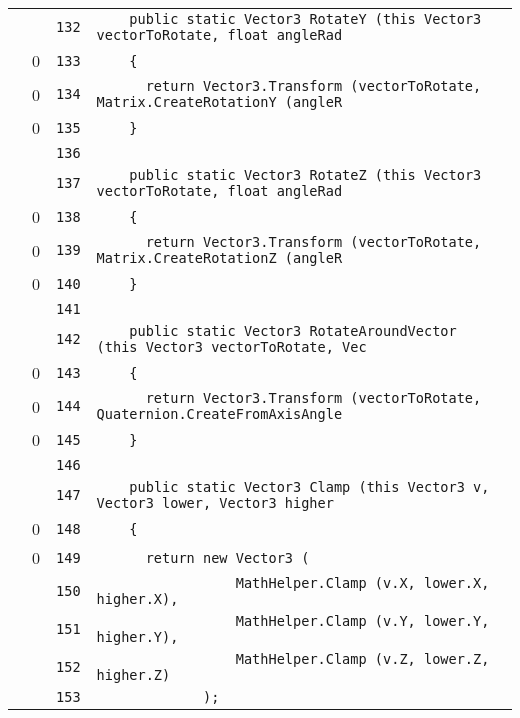 \documentclass[a4paper,10pt]{article}
\begin{document}
\begin{longtable}[l]{lrrl}
\cellcolor{gray} &  & \verb~132~ & \verb~    public static Vector3 RotateY (this Vector3 vectorToRotate, float angleRad~\\
\cellcolor{red} & 0 & \verb~133~ & \verb~    {~\\
\cellcolor{red} & 0 & \verb~134~ & \verb~      return Vector3.Transform (vectorToRotate, Matrix.CreateRotationY (angleR~\\
\cellcolor{red} & 0 & \verb~135~ & \verb~    }~\\
\cellcolor{gray} &  & \verb~136~ & \verb~~\\
\cellcolor{gray} &  & \verb~137~ & \verb~    public static Vector3 RotateZ (this Vector3 vectorToRotate, float angleRad~\\
\cellcolor{red} & 0 & \verb~138~ & \verb~    {~\\
\cellcolor{red} & 0 & \verb~139~ & \verb~      return Vector3.Transform (vectorToRotate, Matrix.CreateRotationZ (angleR~\\
\cellcolor{red} & 0 & \verb~140~ & \verb~    }~\\
\cellcolor{gray} &  & \verb~141~ & \verb~~\\
\cellcolor{gray} &  & \verb~142~ & \verb~    public static Vector3 RotateAroundVector (this Vector3 vectorToRotate, Vec~\\
\cellcolor{red} & 0 & \verb~143~ & \verb~    {~\\
\cellcolor{red} & 0 & \verb~144~ & \verb~      return Vector3.Transform (vectorToRotate, Quaternion.CreateFromAxisAngle~\\
\cellcolor{red} & 0 & \verb~145~ & \verb~    }~\\
\cellcolor{gray} &  & \verb~146~ & \verb~~\\
\cellcolor{gray} &  & \verb~147~ & \verb~    public static Vector3 Clamp (this Vector3 v, Vector3 lower, Vector3 higher~\\
\cellcolor{red} & 0 & \verb~148~ & \verb~    {~\\
\cellcolor{red} & 0 & \verb~149~ & \verb~      return new Vector3 (~\\
\cellcolor{gray} &  & \verb~150~ & \verb~                 MathHelper.Clamp (v.X, lower.X, higher.X),~\\
\cellcolor{gray} &  & \verb~151~ & \verb~                 MathHelper.Clamp (v.Y, lower.Y, higher.Y),~\\
\cellcolor{gray} &  & \verb~152~ & \verb~                 MathHelper.Clamp (v.Z, lower.Z, higher.Z)~\\
\cellcolor{gray} &  & \verb~153~ & \verb~             );~\\

\end{longtable}
\end{document}
